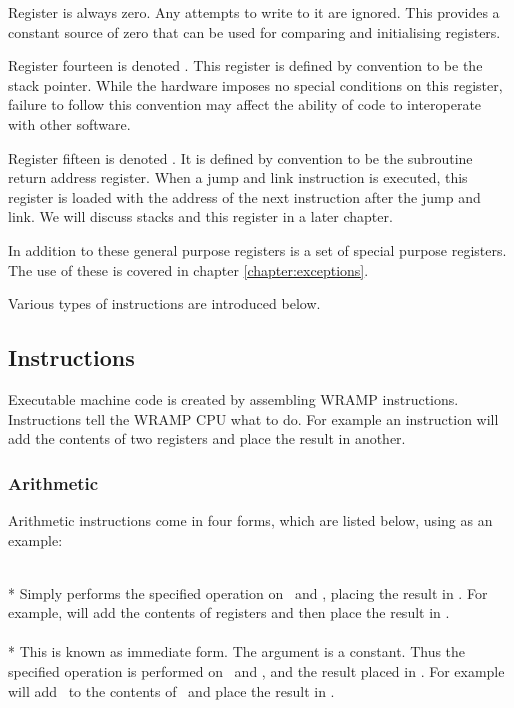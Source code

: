 Register  is always zero. Any attempts to write to it are
ignored. This provides a constant source of zero that can be used for
comparing and initialising registers.

Register fourteen is denoted . This register is defined by
convention to be the stack pointer. While the hardware imposes no
special conditions on this register, failure to follow this convention
may affect the ability of code to interoperate with other software.

Register fifteen is denoted . It is defined by convention to
be the subroutine return address register. When a jump and link
instruction is executed, this register is loaded with the address of
the next instruction after the jump and link. We will discuss stacks
and this register in a later chapter.

In addition to these general purpose registers is a set of special
purpose registers. The use of these is covered in chapter
\ref{chapter:exceptions}.

Various types of instructions are introduced below.

\subsection{Instructions}

Executable machine code is created by assembling WRAMP instructions.
Instructions tell the WRAMP CPU what to do. For example an 
instruction will add the contents of two registers and place the result
in another.

\subsubsection{Arithmetic}
Arithmetic instructions come in four forms, which are listed
below, using  as an example:


 \\*
Simply performs the specified operation
on \regs\ and \regt, placing the result in \regd. For example,
\mbox{} will add the contents of registers
 and  then place the result in .
\\

 \\*
This is known as immediate form.
The argument  is a constant. Thus the specified
operation is performed on \regs\ and , and the result
placed in \regd. For example \mbox{} will add
\ to the contents of \ and place the result in .
\\

